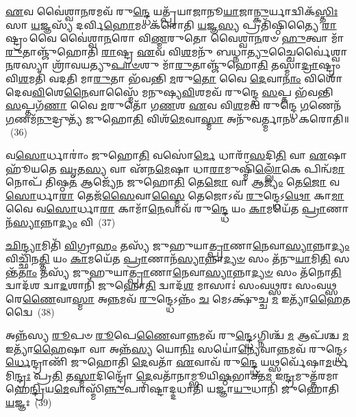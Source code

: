 \-\ul{𑌏}\-𑌵 𑌵𑍈॑𑌶𑍍𑌵𑌾\-\ul{𑌨}\-𑌰𑌮𑌵᳴ 𑌰𑍁\-\ul{𑌨𑍍𑌦𑍍𑌧𑍇} 𑌯𑌤𑍍𑌪𑍍𑌰᳴𑌯𑌾𑌜𑌾𑌨𑍂\-\ul{𑌯𑌾}\-𑌜𑌾\-\ul{𑌨𑍍𑌕𑍁}\-𑌰𑍍𑌯𑌾𑌦𑍍𑌵𑌿𑌕᳴\-\ul{𑌸𑍍𑌤𑌿𑌃} 𑌸𑌾 \ul{𑌯}\-𑌜𑍍𑌞𑌸𑍍𑌯᳴ 𑌦𑌰𑍍𑌵𑌿\-\ul{𑌹𑍋}\-𑌮𑌂 𑌕᳴𑌰𑍋𑌤𑌿 \ul{𑌯}\-𑌜𑍍𑌞\-\ul{𑌸𑍍𑌯} 𑌪𑍍𑌰𑌤𑌿᳴𑌷𑍍𑌠𑌿𑌤𑍍𑌯𑍈 \ul{𑌰𑌾}\-𑌷𑍍𑌟𑍍𑌰𑌂 𑌵𑍈 𑌵𑍈॑𑌶𑍍𑌵𑌾\-\ul{𑌨}\-𑌰𑍋 𑌵𑌿\-\ul{𑌣𑍍𑌮}\-𑌰𑍁𑌤𑍋 𑌵𑍈𑌶𑍍𑌵𑌾\-\ul{𑌨}\-𑌰𑍞 \ul{𑌹𑍁}\-𑌤𑍍𑌵𑌾 𑌮𑌾᳴\-\ul{𑌰𑍁}\-𑌤𑌾𑌞𑍍𑌜𑍁᳴𑌹𑍋𑌤𑌿 \ul{𑌰𑌾}\-𑌷𑍍𑌟𑍍𑌰 \ul{𑌏}\-𑌵 𑌵𑌿\-\ul{𑌶}\-𑌮𑌨𑍁᳴ 𑌬𑌧𑍍𑌨𑌾\-\ul{𑌤𑍍𑌯𑍁}\-𑌚𑍍𑌚𑍈𑌰𑍍𑌵𑍈॑𑌶𑍍𑌵𑌾\-\ul{𑌨}\-𑌰𑌸𑍍𑌯𑌾 𑌶𑍍𑌰𑌾᳴𑌵𑌯𑌤𑍍𑌯𑍁\-\ul{𑌪𑌾}\-\-\ul{𑍞}\-𑌶𑍁 𑌮𑌾᳴\-\ul{𑌰𑍁}\-𑌤𑌾𑌞𑍍𑌜𑍁᳴𑌹𑍋\-\ul{𑌤𑌿} 𑌤𑌸𑍍𑌮𑌾॑\-\ul{𑌦𑍍𑌰𑌾}\-𑌷𑍍𑌟𑍍𑌰𑌂 𑌵𑌿\-\ul{𑌶}\-𑌮𑌤𑌿᳴ 𑌵𑌦𑌤𑌿 𑌮𑌾\-\ul{𑌰𑍁}\-𑌤𑌾 𑌭᳴𑌵𑌨𑍍𑌤𑌿 \ul{𑌮}\-𑌰𑍁\-\ul{𑌤𑍋} 𑌵𑍈 \ul{𑌦𑍇}\-𑌵𑌾\-\ul{𑌨𑌾𑌂} 𑌵𑌿𑌶𑍋᳴ 𑌦𑍇𑌵\-\ul{𑌵𑌿}\-𑌶𑍇\-\ul{𑌨𑍈}\-𑌵𑌾𑌸𑍍𑌮𑍈᳴ 𑌮𑌨𑍁𑌷𑍍𑌯\-\ul{𑌵𑌿}\-𑌶𑌮𑌵᳴ 𑌰𑍁𑌨𑍍𑌦𑍍𑌧𑍇 \ul{𑌸}\-𑌪𑍍𑌤 𑌭᳴𑌵𑌨𑍍𑌤𑌿 \ul{𑌸}\-𑌪𑍍𑌤𑌗᳴\-\ul{𑌣𑌾} 𑌵𑍈 \ul{𑌮}\-𑌰𑍁𑌤𑍋᳴ 𑌗\-\ul{𑌣}\-𑌶 \ul{𑌏}\-𑌵 𑌵𑌿\-\ul{𑌶}\-𑌮𑌵᳴ 𑌰𑍁𑌨𑍍𑌦𑍍𑌧𑍇 \ul{𑌗}\-𑌣𑍇𑌨᳴ \ul{𑌗}\-𑌣𑌮᳴\-\ul{𑌨𑍁}\-𑌦𑍍𑌰𑍁𑌤𑍍𑌯᳴ 𑌜𑍁𑌹𑍋\-\ul{𑌤𑌿} 𑌵𑌿𑌶᳴\-\ul{𑌮𑍇}\-𑌵𑌾\-\ul{𑌸𑍍𑌮𑌾} 𑌅𑌨𑍁᳴𑌵𑌰𑍍𑌤𑍍𑌮𑌾𑌨𑌂 𑌕𑌰𑍋𑌤𑌿॥~(36)

{\anuvakamend[{𑌅\-\ul{𑌗𑍍𑌨𑍇} 𑌪𑍍𑌰𑍇𑌹𑍍𑌯𑌵᳴ 𑌸𑍍𑌮 𑌦𑍁\-\ul{𑌹𑍇} 𑌤𑌾𑌂 \ul{𑌪𑍍𑌰}\-𑌜𑌾𑌪᳴𑌤𑍇𑌃 \ul{𑌸𑌾}\-𑌕𑍍𑌷𑌾𑌨𑍍𑌮᳴𑌨𑍁𑌷𑍍𑌯\-\ul{𑌵𑌿}\-𑌶𑌮𑍇𑌕᳴𑌵𑌿𑍞𑌶𑌤𑌿𑌶𑍍𑌚}]}%

𑌵\-\ul{𑌸𑍋}\-𑌰𑍍𑌧𑌾𑌰𑌾𑌂॑ 𑌜𑍁𑌹𑍋\-\ul{𑌤𑌿} 𑌵𑌸𑍋॑\-\ul{𑌰𑍍𑌮𑍇} 𑌧𑌾𑌰𑌾᳴\-\ul{𑌸}\-𑌦𑌿\-\ul{𑌤𑌿} 𑌵𑌾 \ul{𑌏}\-𑌷𑌾 𑌹𑍂᳴𑌯𑌤𑍇 \ul{𑌘𑍃}\-𑌤\-\ul{𑌸𑍍𑌯} 𑌵𑌾 𑌏᳴𑌨\-\ul{𑌮𑍇}\-𑌷𑌾 𑌧𑌾\-\ul{𑌰𑌾}\-𑌮𑍁𑌷𑍍𑌮𑌿᳴\-\ul{𑌲𑍍𑌲𑍋𑌁}\-𑌕𑍇 𑌪𑌿𑌨𑍍𑌵᳴\-\ul{𑌮𑌾}\-𑌨𑍋𑌪᳴ 𑌤𑌿𑌷𑍍𑌠\-\ul{𑌤} 𑌆𑌜𑍍𑌯𑍇᳴𑌨 𑌜𑍁𑌹𑍋\-\ul{𑌤𑌿} 𑌤𑍇\-\ul{𑌜𑍋} 𑌵𑌾 𑌆\-\ul{𑌜𑍍𑌯𑌂} 𑌤𑍇\-\ul{𑌜𑍋} 𑌵\-\ul{𑌸𑍋}\-𑌰𑍍𑌧𑌾\-\ul{𑌰𑌾} 𑌤𑍇𑌜᳴\-\ul{𑌸𑍈}\-𑌵𑌾\-\ul{𑌸𑍍𑌮𑍈} 𑌤𑍇𑌜𑍋\-𑌽𑌵᳴ \ul{𑌰𑍁}\-𑌨𑍍𑌦𑍍𑌧𑍇\-𑌽\-\ul{𑌥𑍋} 𑌕𑌾\-\ul{𑌮𑌾} 𑌵𑍈 𑌵\-\ul{𑌸𑍋}\-𑌰𑍍𑌧𑌾\-\ul{𑌰𑌾} 𑌕𑌾𑌮𑌾᳴\-\ul{𑌨𑍇}\-𑌵𑌾𑌵᳴ 𑌰𑍁\-\ul{𑌨𑍍𑌦𑍍𑌧𑍇} 𑌯𑌂 \ul{𑌕𑌾}\-𑌮𑌯𑍇᳴𑌤 \ul{𑌪𑍍𑌰𑌾}\-𑌣𑌾𑌨᳴\-\ul{𑌸𑍍𑌯𑌾}\-𑌨𑍍𑌨𑌾\-\ul{𑌦𑍍𑌯𑌂} 𑌵𑌿~(37)

\-\ul{𑌛𑌿}\-\-\ul{𑌨𑍍𑌦𑍍𑌯𑌾}\-𑌮𑌿𑌤𑌿᳴ \ul{𑌵𑌿}\-𑌗𑍍𑌰𑌾\-\ul{𑌹𑌂} 𑌤𑌸𑍍𑌯᳴ 𑌜𑍁𑌹𑍁𑌯𑌾\-\ul{𑌤𑍍𑌪𑍍𑌰𑌾}\-𑌣𑌾\-\ul{𑌨𑍇}\-𑌵𑌾\-\ul{𑌸𑍍𑌯𑌾}\-𑌨𑍍𑌨𑌾\-\ul{𑌦𑍍𑌯𑌂} 𑌵𑌿𑌚𑍍𑌛𑌿᳴𑌨\-\ul{𑌤𑍍𑌤𑌿} 𑌯𑌂 \ul{𑌕𑌾}\-𑌮𑌯𑍇᳴𑌤 \ul{𑌪𑍍𑌰𑌾}\-𑌣𑌾𑌨᳴\-\ul{𑌸𑍍𑌯𑌾}\-𑌨𑍍𑌨𑌾\-\ul{𑌦𑍍𑌯}\-\-\ul{𑍞} 𑌸𑌂 𑌤᳴𑌨𑍁\-\ul{𑌯𑌾}\-𑌮𑌿\-\ul{𑌤𑌿} 𑌸𑌨𑍍𑌤᳴\-\ul{𑌤𑌾𑌂} 𑌤𑌸𑍍𑌯᳴ 𑌜𑍁𑌹𑍁𑌯𑌾\-\ul{𑌤𑍍𑌪𑍍𑌰𑌾}\-𑌣𑌾\-\ul{𑌨𑍇}\-𑌵𑌾\-\ul{𑌸𑍍𑌯𑌾}\-𑌨𑍍𑌨𑌾\-\ul{𑌦𑍍𑌯}\-\-\ul{𑍞} 𑌸𑌂 𑌤᳴𑌨𑍋\-\ul{𑌤𑌿} 𑌦𑍍𑌵𑌾𑌦᳴𑌶 𑌦𑍍𑌵𑌾\-\ul{𑌦}\-𑌶𑌾𑌨𑌿᳴ 𑌜𑍁𑌹𑍋\-\ul{𑌤𑌿} 𑌦𑍍𑌵𑌾𑌦᳴\-\ul{𑌶} 𑌮𑌾𑌸𑌾𑌃॑ 𑌸𑌂𑌵\-\ul{𑌥𑍍𑌸}\-𑌰𑌃 𑌸𑌂𑌵\-\ul{𑌥𑍍𑌸}\-𑌰𑍇\-\ul{𑌣𑍈}\-𑌵𑌾\-\ul{𑌸𑍍𑌮𑌾} 𑌅\-\ul{𑌨𑍍𑌨}\-𑌮𑌵᳴ \ul{𑌰𑍁}\-𑌨𑍍𑌦𑍍𑌧𑍇\-𑌽𑌨𑍍𑌨𑌂᳴ \ul{𑌚} 𑌮𑍇\-𑌽𑌕𑍍𑌷𑍁᳴𑌚𑍍𑌚 \ul{𑌮} 𑌇𑌤𑍍𑌯𑌾᳴\-\ul{𑌹𑍈}\-𑌤𑌦𑍍𑌵𑍈~(38)

𑌅𑌨𑍍𑌨᳴𑌸𑍍𑌯 \ul{𑌰𑍂}\-𑌪𑍞 \ul{𑌰𑍂}\-𑌪𑍇\-\ul{𑌣𑍈}\-𑌵𑌾\-\ul{𑌨𑍍𑌨}\-𑌮𑌵᳴ 𑌰𑍁\-\ul{𑌨𑍍𑌦𑍍𑌧𑍇}\-\-𑌽𑌗𑍍𑌨𑌿𑌶𑍍𑌚᳴ \ul{𑌮} 𑌆𑌪᳴𑌶𑍍𑌚 \ul{𑌮} 𑌇𑌤𑍍𑌯𑌾᳴\-\ul{𑌹𑍈}\-𑌷𑌾 𑌵𑌾 𑌅𑌨𑍍𑌨᳴\-\ul{𑌸𑍍𑌯} 𑌯𑍋\-\ul{𑌨𑌿𑌃} 𑌸𑌯𑍋॑\-\ul{𑌨𑍍𑌯𑍇}\-𑌵𑌾\-\ul{𑌨𑍍𑌨}\-𑌮𑌵᳴ 𑌰𑍁𑌨𑍍𑌦𑍍𑌧𑍇\-𑌽\-\ul{𑌰𑍍𑌧𑍇}\-𑌨𑍍𑌦𑍍𑌰𑌾𑌣𑌿᳴ 𑌜𑍁𑌹𑍋𑌤𑌿 \ul{𑌦𑍇}\-𑌵𑌤𑌾᳴ \ul{𑌏}\-𑌵𑌾𑌵᳴ 𑌰𑍁\-\ul{𑌨𑍍𑌦𑍍𑌧𑍇} 𑌯𑌥𑍍𑌸𑌰𑍍𑌵𑍇᳴𑌷𑌾\-\ul{𑌮}\-𑌰𑍍𑌧𑌮𑌿\-\ul{𑌨𑍍𑌦𑍍𑌰𑌃} 𑌪𑍍𑌰\-\ul{𑌤𑌿} 𑌤\-\ul{𑌸𑍍𑌮𑌾}\-𑌦𑌿𑌨𑍍𑌦𑍍𑌰𑍋᳴ \ul{𑌦𑍇}\-𑌵𑌤𑌾᳴𑌨𑌾𑌮𑍍𑌭𑍂𑌯𑌿\-\ul{𑌷𑍍𑌠}\-𑌭𑌾𑌕𑍍𑌤᳴\-\ul{𑌮} 𑌇\-\ul{𑌨𑍍𑌦𑍍𑌰}\-𑌮𑍁𑌤𑍍𑌤᳴𑌰𑌮𑌾𑌹𑍇\-\ul{𑌨𑍍𑌦𑍍𑌰𑌿}\-𑌯\-\ul{𑌮𑍇}\-𑌵𑌾𑌸𑍍𑌮𑌿᳴\-\ul{𑌨𑍍𑌨𑍁}\-𑌪𑌰𑌿᳴𑌷𑍍𑌟𑌾𑌦𑍍𑌦𑌧𑌾𑌤𑌿 𑌯𑌜𑍍𑌞𑌾\-\ul{𑌯𑍁}\-𑌧𑌾𑌨𑌿᳴ 𑌜𑍁𑌹𑍋𑌤𑌿 \ul{𑌯}\-𑌜𑍍𑌞𑌃~(39)

